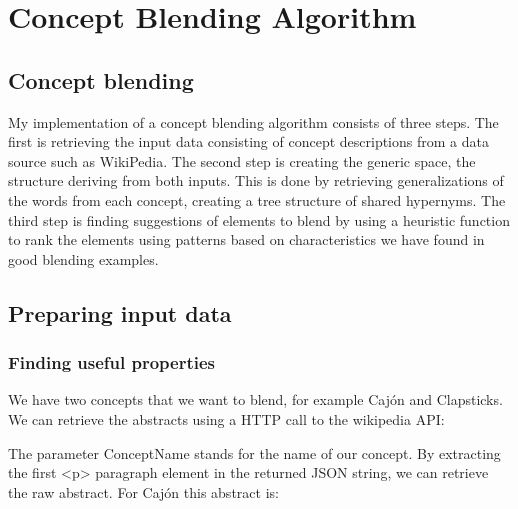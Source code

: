 
\chapter{Concept Blending Algorithm} %

\label{Chapter5} %


\section{Concept blending}
My implementation of a concept blending algorithm consists of three steps. The first is retrieving the input data consisting of concept descriptions from a data source such as WikiPedia. The second step is creating the generic space, the structure deriving from both inputs. This is done by retrieving generalizations of the words from each concept, creating a tree structure of shared hypernyms. The third step is finding suggestions of elements to blend by using a heuristic function to rank the elements using patterns based on characteristics we have found in good blending examples.


\section{Preparing input data}

\subsection{Finding useful properties}
We have two concepts that we want to blend, for example Cajón and Clapsticks.
We can retrieve the abstracts using a HTTP call to the wikipedia API:

\noindent{}
The parameter ConceptName stands for the name of our concept. By extracting the first <p> paragraph element in the returned JSON string, we can retrieve the raw abstract. For Cajón this abstract is:
 
\noindent{}

